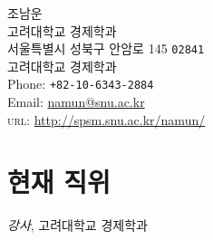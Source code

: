 \documentclass[11pt, a4paper]{article} %
\begin{document}

{\LARGE 조남운}\\[1cm] %
고려대학교 경제학과\\ %
서울특별시 성북구 안암로 145 \texttt{02841}\\
고려대학교 경제학과
\\[.2cm]
Phone: \texttt{+82-10-6343-2884}\\ %
Email: \href{mailto:namun@snu.ac.kr}{namun@snu.ac.kr}\\ %
\textsc{url}: \href{http://spsm.snu.ac.kr/namun/}{http://spsm.snu.ac.kr/namun/}\\ %






\section*{현재 직위}

\emph{강사}, 고려대학교 경제학과
\end{document}
